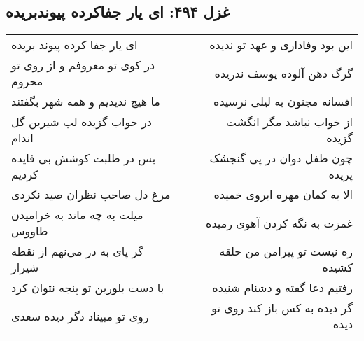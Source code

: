 \begin{center}
\section*{غزل ۴۹۴: ای یار جفاکرده پیوندبریده}
\label{sec:494}
\begin{longtable}{l p{0.5cm} r}
ای یار جفا کرده پیوند بریده
&&
این بود وفاداری و عهد تو ندیده
\\
در کوی تو معروفم و از روی تو محروم
&&
گرگ دهن آلوده یوسف ندریده
\\
ما هیچ ندیدیم و همه شهر بگفتند
&&
افسانه مجنون به لیلی نرسیده
\\
در خواب گزیده لب شیرین گل اندام
&&
از خواب نباشد مگر انگشت گزیده
\\
بس در طلبت کوشش بی فایده کردیم
&&
چون طفل دوان در پی گنجشک پریده
\\
مرغ دل صاحب نظران صید نکردی
&&
الا به کمان مهره ابروی خمیده
\\
میلت به چه ماند به خرامیدن طاووس
&&
غمزت به نگه کردن آهوی رمیده
\\
گر پای به در می‌نهم از نقطه شیراز
&&
ره نیست تو پیرامن من حلقه کشیده
\\
با دست بلورین تو پنجه نتوان کرد
&&
رفتیم دعا گفته و دشنام شنیده
\\
روی تو مبیناد دگر دیده سعدی
&&
گر دیده به کس باز کند روی تو دیده
\\
\end{longtable}
\end{center}
